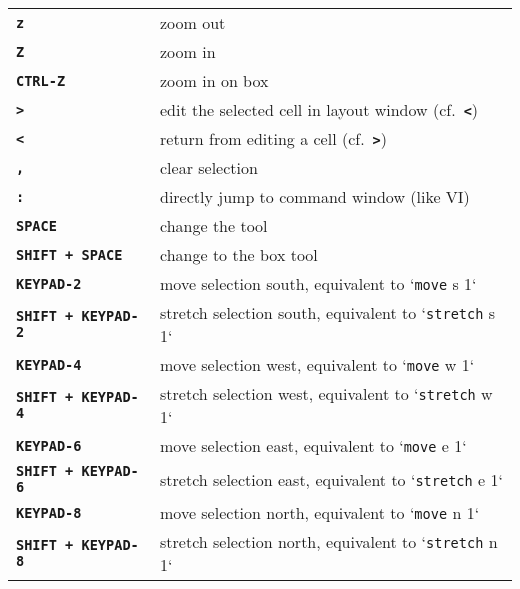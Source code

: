 \documentclass[10pt,a4paper]{article}
\newcommand{\key}[1]{\texttt{\textbf{#1}}}
\newcommand{\mac}[1]{\texttt{#1}}
\begin{document}
\begin{tabular}{p{}p{}}
		\key{z} & zoom out\\
		\key{Z} & zoom in\\
		\key{CTRL-Z} & zoom in on box\\
		\key{>} & edit the selected cell in layout window (cf.~\key{<})\\
		\key{<} & return from editing a cell (cf.~\key{>})\\
		\key{,} & clear selection\\
		\key{:} & directly jump to command window (like VI)\\
		\key{SPACE} & change the tool\\
		\key{SHIFT + SPACE} & change to the box tool\\
		\key{KEYPAD-2} & move selection south, equivalent to `\mac{move} s 1`\\
		\key{SHIFT + KEYPAD-2} & stretch selection south, equivalent to `\mac{stretch} s 1`\\
		\key{KEYPAD-4} & move selection west, equivalent to `\mac{move} w 1`\\
		\key{SHIFT + KEYPAD-4} & stretch selection west, equivalent to `\mac{stretch} w 1`\\
		\key{KEYPAD-6} & move selection east, equivalent to `\mac{move} e 1` \\
		\key{SHIFT + KEYPAD-6} & stretch selection east, equivalent to `\mac{stretch} e 1`\\
		\key{KEYPAD-8} & move selection north, equivalent to `\mac{move} n 1` \\
		\key{SHIFT + KEYPAD-8} & stretch selection north, equivalent to `\mac{stretch} n 1`\\
		\bottomrule
	\end{tabular}

	\newpage
	
\end{document}

